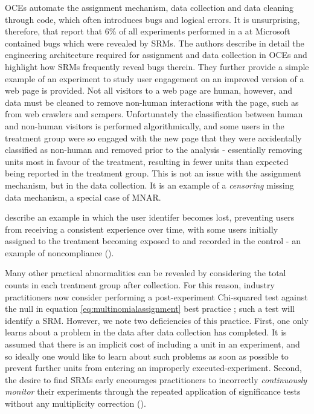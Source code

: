 \documentclass[11pt]{article}
\begin{document}
OCEs automate the assignment mechanism, data collection and data cleaning through code, which often introduces bugs and logical errors.
It is unsurprising, therefore, that \cite{fabijan} report that 6\% of all experiments performed in a at Microsoft contained bugs which were revealed by SRMs.
The authors describe in detail the engineering architecture required for assignment and data collection in OCEs and highlight how SRMs frequently reveal bugs therein.
They further provide a simple example of an experiment to study user engagement on an improved version of a web page is provided.
Not all visitors to a web page are human, however, and data must be cleaned to remove non-human interactions with the page, such as from web crawlers and scrapers.
Unfortunately the classification between human and non-human visitors is performed algorithmically, and some users in the treatment group were so engaged with the new page that they were accidentally classified as non-human and removed prior to the analysis - essentially removing units most in favour of the treatment, resulting in fewer units than expected being reported in the treatment group.
This is not an issue with the assignment mechanism, but in the data collection.
It is an example of a \textit{censoring} missing data mechanism, a special case of MNAR.

\cite{zhao} describe an example in which the user identifer becomes lost, preventing users from receiving a consistent experience over time, with some users initially assigned to the treatment becoming exposed to and recorded in the control - an example of noncompliance (\cite{imbens}).


Many other practical abnormalities can be revealed by considering the total counts in each treatment group after collection.
For this reason, industry practitioners now consider performing a post-experiment Chi-squared test against the null in equation \eqref{eq:multinomialassignment} best practice \citep{linkedin}; such a test will identify a SRM.
However, we note two deficiencies of this practice.
First, one only learns about a problem in the data after data collection has completed.
It is assumed that there is an implicit cost of including a unit in an experiment, and so ideally one would like to learn about such problems as soon as possible to prevent further units from entering an improperly executed-experiment.
Second, the desire to find SRMs early encourages practitioners to incorrectly \textit{continuously monitor} their experiments through the repeated application of significance tests without any multiplicity correction (\cite{armitage}).
\end{document}
